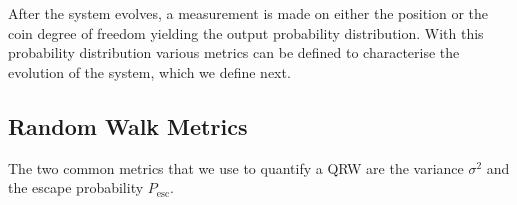 \documentclass[aps,pra,twocolumn,amsmath,amssymb,nofootinbib,superscriptaddress]{revtex4}
\newcommand{\ket}[1]{|#1\rangle}
\begin{document}
After the system evolves, a measurement is made on either the position or the coin degree of freedom yielding the  output probability distribution. With this probability distribution various metrics can be defined to characterise the evolution of the system, which we define next.



\subsection{Random Walk Metrics}
The two common metrics that we use to quantify a QRW are the variance $\sigma^{2}$ and the escape probability $P_\mathrm{esc}$.
\end{document}
